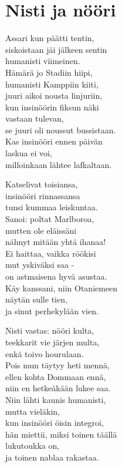 \section{Nisti ja nööri}

Assari kun päätti tentin,\\
siskoistaan jäi jälkeen sentin\\
humanisti viimeinen.\\
Hämärä jo Stadiin hiipi,\\
humanisti Kamppiin kiiti,\\
juuri aikoi nousta linjuriin,\\
kun insinöörin fiksun näki\\
vastaan tulevan,\\
se juuri oli noussut bussistaan.\\
Kas insinööri ennen päivän\\
laskua ei voi,\\
milloinkaan lähtee lafkaltaan.

Katselivat toisiansa,\\
insinööri rinnassansa\\
tunsi kummaa leiskuntaa.\\
Sanoi: poltat Marlboroa,\\
mutten ole eläissäni\\
nähnyt mitään yhtä ihanaa!\\
Ei haittaa, vaikka röökisi\\
mut yskiväksi saa -\\
on astmaisena hyvä asustaa.\\
Käy kanssani, niin Otaniemeen\\
näytän sulle tien,\\
ja sinut perhekylään vien.

Nisti vastas: nööri kulta,\\
teekkarit vie järjen multa,\\
enkä toivo hourulaan.\\
Pois mun täytyy heti mennä,\\
ellen kohta Dommaan ennä,\\
niin en hetkeäkään lukee saa.\\
Niin lähti kaunis humanisti,\\
mutta vieläkin,\\
kun insinööri öisin integroi,\\
hän miettii, miksi toinen täällä\\
lukutoukka on,\\
ja toinen nablaa rakastaa.